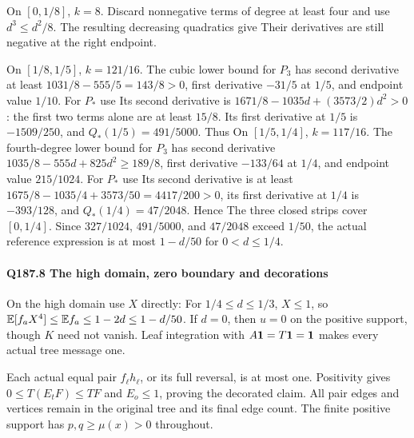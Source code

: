 On $[0,1/8]$, $k=8$. Discard nonnegative terms of degree at least
four and use $d^3\le d^2/8$. The resulting decreasing quadratics give
Their derivatives are still negative at the right endpoint.

On $[1/8,1/5]$, $k=121/16$. The cubic lower bound for $P_3$
has second derivative at least $1031/8-555/5=143/8>0$,
first derivative $-31/5$ at $1/5$, and endpoint value $1/10$.
For $P_*$ use
Its second derivative is $1671/8-1035d+(3573/2)d^2>0$:
the first two terms alone are at least $15/8$. Its first derivative
at $1/5$ is $-1509/250$, and $Q_*(1/5)=491/5000$. Thus
On $[1/5,1/4]$, $k=117/16$. The fourth-degree lower bound for
$P_3$ has second derivative
$1035/8-555d+825d^2\ge189/8$, first derivative $-133/64$ at
$1/4$, and endpoint value $215/1024$. For $P_*$ use
Its second derivative is at least
$1675/8-1035/4+3573/50=4417/200>0$, its first derivative
at $1/4$ is $-393/128$, and $Q_*(1/4)=47/2048$. Hence
The three closed strips cover $[0,1/4]$. Since
$327/1024$, $491/5000$, and $47/2048$ exceed $1/50$,
the actual reference expression is at most $1-d/50$ for
$0<d\le1/4$.

\paragraph{Q187.8 The high domain, zero boundary and decorations}
On the high domain use $X$ directly:
For $1/4\le d\le1/3$, $X\le1$, so
$\mathbb E[f_aX^4]\le\mathbb E f_a\le1-2d\le1-d/50$.
If $d=0$, then $u=0$ on the positive support, though $K$ need
not vanish. Leaf integration with $A\mathbf1=T\mathbf1=\mathbf1$ makes
every actual tree message one.

Each actual equal pair $f_\ell h_\ell$, or its full reversal,
is at most one. Positivity gives $0\le T(E_tF)\le TF$ and
$E_o\le1$, proving the decorated claim. All pair edges and
vertices remain in the original tree and its final edge count.
The finite positive support has $p,q\ge\mu(x)>0$ throughout.
